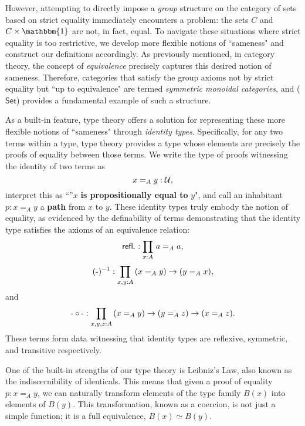 \documentclass[main.tex]{subfiles}
\begin{document}
However, attempting to directly impose a \textit{group} structure on the category of sets based on strict equality immediately encounters a problem: the sets $C$ and $C \times \mathbbm{1}$ are not, in fact, equal. To navigate these situations where strict equality is too restrictive, we develop more flexible notions of ``sameness" and construct our definitions accordingly. As previously mentioned, in category theory, the concept of \textit{equivalence} precisely captures this desired notion of sameness. Therefore, categories that satisfy the group axioms not by strict equality but ``up to equivalence" are termed \textit{symmetric monoidal categories}, and ($\mathsf{Set}$) provides a fundamental example of such a structure.

As a built-in feature, type theory offers a solution for representing these more flexible notions of ``sameness" through \textit{identity types}. Specifically, for any two terms within a type, type theory provides a type whose elements are precisely the proofs of equality between those terms. We write the type of proofs witnessing the identity of two terms as \[x=_A y : \mathcal{U},\] interpret this as ``''$x$ \textbf{is propositionally equal to} $y$", and call an inhabitant $p : x =_A y$ a \textbf{path} from $x$ to $y$. These identity types truly embody the notion of equality, as evidenced by the definability of terms demonstrating that the identity type satisfies the axioms of an equivalence relation:
 $$\refl{\text-} : \prd{x:A}a=_A a,$$
 $$(\text-)^{-1}:\prd{x,y:A}(x =_A y ) \to (y =_A x),$$ and
 $$\text-\circ\text- : \prd{x,y,z : A} (x =_A y) \to (y =_A z) \to (x =_A z).$$
These terms form data witnessing that identity types are reflexive, symmetric, and transitive respectively.

One of the built-in strengths of our type theory is Leibniz's Law, also known as the indiscernibility of identicals. This means that given a proof of equality $p : x =_A y$, we can naturally transform elements of the type family $B(x)$ into elements of $B(y)$. This transformation, known as a coercion, is not just a simple function; it is a full equivalence, $B(x) \simeq B(y)$.
\end{document}
